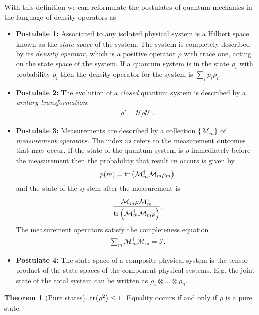 \documentclass{book}
\theoremstyle{definition}
\newtheorem{thm}{Theorem}[section]
\newcommand{\M}{\mathcal{M}}
\newcommand{\f}[2]{\frac{#1}{#2}}
\newcommand{\lp}{\left(}
\newcommand{\rp}{\right)}
\newcommand{\U}{\mathcal{U}}
\newcommand{\Id}{\mathcal{I}}
\begin{document}
With this definition we can reformulate the postulates of quantum mechanics in the language of density operators as 
\begin{itemize}
	\item \textbf{Postulate 1:} Associated to any isolated physical system is a Hilbert space known as the \textit{state space} of the system. The system is completely described by its \textit{density operator}, which is a positive operator $\rho$ with trace one, acting on the state space of the system. If a quantum system is in the state $\rho_i$ with probability $p_i$ then the density operator for the system is $\sum _i p_i \rho_i$.
	
	\item \textbf{Postulate 2:} The evolution of a \textit{closed} quantum system is described by a \textit{unitary transformation}:
	\begin{align}
	\rho' = \U \rho \U^\dagger.
	\end{align} 
	
	
	
	\item \textbf{Postulate 3:} Measurements are described by a collection $\{\M_m\}$ of \textit{measurement operators}. The index $m$ refers to the measurement outcomes that may occur. If the state of the quantum system is $\rho$ immediately before the measurement then the probability that result $m$ occurs is given by
	\begin{align}
	p(m) = \tr\lp \M_m^\dagger  \M_m \rho_m \rp
	\end{align}
	and the state of the system after the measurement is 
	\begin{align}
	\f{\M_m \rho \M_m^\dagger}{\tr\lp \M_m^\dagger \M_m \rho \rp}.
	\end{align}
	The measurement operators satisfy the completeness equation
	\begin{align}
	\sum_m \M_m^\dagger \M_m = \Id.
	\end{align}
	
	
	
	\item \textbf{Postulate 4:} The state space of a composite physical system is the tensor product of the state spaces of the component physical systems. E.g. the joint state of the total system can be written as $\rho_1 \otimes \dots \otimes \rho_n$.
\end{itemize}



\begin{thm}[Pure states] 
	$\tr(\rho^2) \leq 1$. Equality occurs if and only if $\rho$ is a pure state. 
\end{thm}
\end{document}
